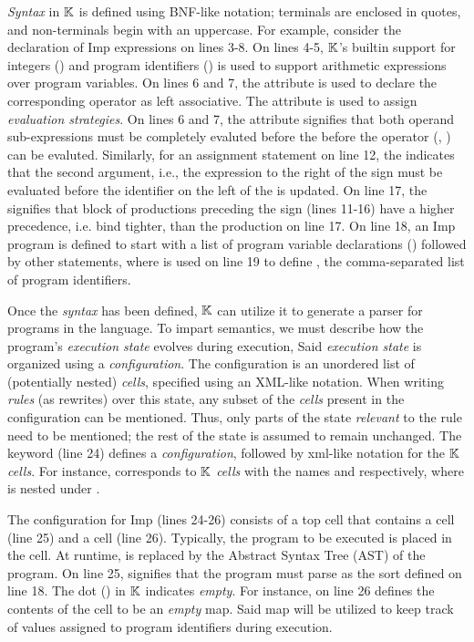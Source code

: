 \emph{Syntax} in $\mathbb{K}{}$ is defined using BNF-like notation; terminals are enclosed
in quotes, and non-terminals begin with an uppercase. For example,
consider the declaration of Imp expressions on lines 3-8. On lines 4-5,
$\mathbb{K}$'s builtin support for integers () and program identifiers
() is used to support arithmetic expressions over program variables.
On lines 6 and 7, the attribute  is used to declare the
corresponding operator as left associative. The  attribute is used
to assign \emph{evaluation strategies}. On lines 6 and 7, the attribute
signifies that both operand sub-expressions must be completely evaluted before the
before the operator (\inlinek{+}, \inlinek{-}) can be evaluted. Similarly, for
an assignment statement on line 12,
the  indicates that the second argument, i.e., the
expression to the right of the \inlineimp{=} sign must be evaluated before
the identifier on the left of the \inlineimp{=} is updated. On line 17,
the \inlinek{>} signifies that block of  productions preceding
the sign (lines 11-16) have a higher precedence, i.e. bind tighter,
than the production on line 17.
On line 18, an Imp program is defined to start with a list of program variable
declarations () followed by other statements, where
  is used on line 19 to define , the comma-separated list of
program identifiers.

Once the \emph{syntax} has been defined, $\mathbb{K}$ can utilize it to generate a
parser for programs in the language. To impart semantics,
we must describe how the program's \emph{execution state} evolves during execution,
Said \emph{execution state} is organized using a \emph{configuration}.
The configuration is an unordered list of (potentially nested) \emph{cells},
specified using an XML-like notation. When writing \emph{rules} (as rewrites)
over this state, any subset of the \emph{cells} present in the configuration
can be mentioned. Thus, only parts of the state \emph{relevant} to the rule
need to be mentioned; the rest of the state is assumed to remain unchanged.
The keyword  (line 24)  defines a \emph{configuration},
followed by xml-like notation for the $\mathbb{K}$ \emph{cells}. For instance,
 corresponds to $\mathbb{K}$ \emph{cells} with
the names  and  respectively, where 
is nested under .

The configuration for Imp (lines 24-26) consists of a top cell 
that contains a  cell (line 25) and a  cell (line 26).
Typically,
the program to be executed is placed in the  cell. At
runtime,  is replaced by the Abstract Syntax Tree (AST) of the program.
On line 25,  signifies that the program must parse as the
sort  defined on line 18. The dot () in $\mathbb{K}$
indicates \emph{empty}. For instance,  on line 26 defines
the contents of the  cell to be an \emph{empty} map.
Said map will be utilized to keep track of values assigned to program
identifiers during execution.

